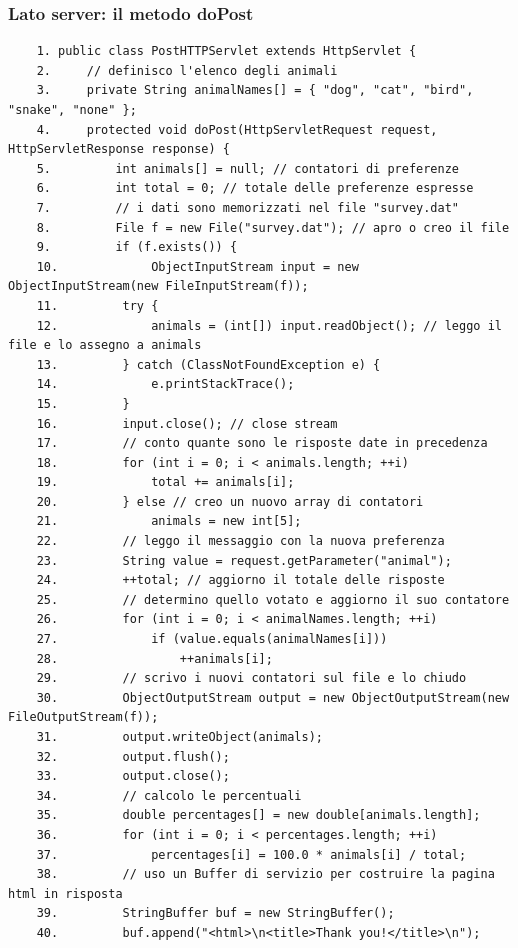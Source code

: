 \subsubsection{Lato server: il metodo doPost}
\begin{verbatim}
    1. public class PostHTTPServlet extends HttpServlet {
    2.     // definisco l'elenco degli animali
    3.     private String animalNames[] = { "dog", "cat", "bird", "snake", "none" };
    4.     protected void doPost(HttpServletRequest request, HttpServletResponse response) {
    5.         int animals[] = null; // contatori di preferenze
    6.         int total = 0; // totale delle preferenze espresse
    7.         // i dati sono memorizzati nel file "survey.dat"
    8.         File f = new File("survey.dat"); // apro o creo il file
    9.         if (f.exists()) {
    10.             ObjectInputStream input = new ObjectInputStream(new FileInputStream(f));
    11.         try {
    12.             animals = (int[]) input.readObject(); // leggo il file e lo assegno a animals
    13.         } catch (ClassNotFoundException e) {
    14.             e.printStackTrace();
    15.         }
    16.         input.close(); // close stream
    17.         // conto quante sono le risposte date in precedenza
    18.         for (int i = 0; i < animals.length; ++i)
    19.             total += animals[i];
    20.         } else // creo un nuovo array di contatori
    21.             animals = new int[5];
    22.         // leggo il messaggio con la nuova preferenza
    23.         String value = request.getParameter("animal");
    24.         ++total; // aggiorno il totale delle risposte
    25.         // determino quello votato e aggiorno il suo contatore
    26.         for (int i = 0; i < animalNames.length; ++i)
    27.             if (value.equals(animalNames[i]))
    28.                 ++animals[i];
    29.         // scrivo i nuovi contatori sul file e lo chiudo
    30.         ObjectOutputStream output = new ObjectOutputStream(new FileOutputStream(f));
    31.         output.writeObject(animals);
    32.         output.flush();
    33.         output.close();
    34.         // calcolo le percentuali
    35.         double percentages[] = new double[animals.length];
    36.         for (int i = 0; i < percentages.length; ++i)
    37.             percentages[i] = 100.0 * animals[i] / total;
    38.         // uso un Buffer di servizio per costruire la pagina html in risposta
    39.         StringBuffer buf = new StringBuffer();
    40.         buf.append("<html>\n<title>Thank you!</title>\n");

\end{verbatim}
